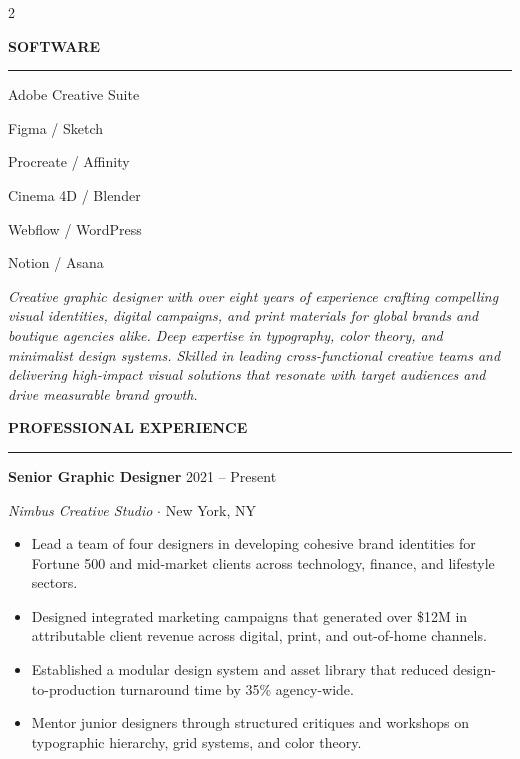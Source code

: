 \documentclass[10pt,a4paper]{article}
\newcommand{\sbsection}[1]{%
  \vspace{14pt}
  {\color{white}\large\bfseries\MakeUppercase{#1}}\par
  \vspace{3pt}
  {\color{accent}\rule{2.8cm}{1.2pt}}\par
  \vspace{10pt}
}
\newcommand{\rsection}[1]{%
  \vspace{16pt}
  {\Large\bfseries\color{primary}\MakeUppercase{#1}}\par
  \vspace{3pt}
  {\color{accent}\rule{\linewidth}{1.5pt}}\par  %
  \vspace{10pt}
}
\begin{document}
\begin{paracol}{2}
\begin{minipage}[t]{4.5cm}
    \sbsection{Software}
    {\color{white}\footnotesize
      Adobe Creative Suite\par
      \vspace{2pt}
      Figma / Sketch\par
      \vspace{2pt}
      Procreate / Affinity\par
      \vspace{2pt}
      Cinema 4D / Blender\par
      \vspace{2pt}
      Webflow / WordPress\par
      \vspace{2pt}
      Notion / Asana\par
    }
  \end{minipage}
\switchcolumn
  \vspace*{1.2cm}
  \par
    {\color{graytext}\small\itshape
      Creative graphic designer with over eight years of experience crafting
      compelling visual identities, digital campaigns, and print materials for
      global brands and boutique agencies alike. Deep expertise in typography,
      color theory, and minimalist design systems. Skilled in leading
      cross-functional creative teams and delivering high-impact visual
      solutions that resonate with target audiences and drive measurable
      brand growth.\par
    }

    \rsection{Professional Experience}

    {\large\bfseries\color{primary} Senior Graphic Designer}
    \hfill
    {\small\color{graytext} 2021 -- Present}\par
    {\itshape Nimbus Creative Studio}
    {\color{accent}$\cdot$}
    New York, NY\par
    \vspace{4pt}
    \begin{itemize}
      \item Lead a team of four designers in developing cohesive brand
            identities for Fortune 500 and mid-market clients across
            technology, finance, and lifestyle sectors.
      \item Designed integrated marketing campaigns that generated over
            \$12M in attributable client revenue across digital, print, and
            out-of-home channels.
      \item Established a modular design system and asset library that reduced
            design-to-production turnaround time by 35\% agency-wide.
      \item Mentor junior designers through structured critiques and workshops
            on typographic hierarchy, grid systems, and color theory.
    \end{itemize}
    \vspace{10pt}


\end{paracol}
\end{document}
